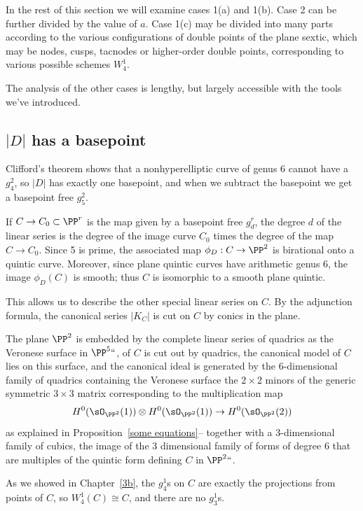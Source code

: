 In the rest of this section we will examine cases 1(a) and 1(b). Case 2 can
be further divided by the value of $a$.
Case 1(c) may be divided into many parts according to the various
configurations
of double points of the plane sextic, which may be nodes, cusps, tacnodes
or higher-order double points,  corresponding to various possible
schemes $W^{1}_{4}$.

The analysis of the other cases is lengthy, but largely accessible with
the tools we've introduced.


\subsection*{$|D|$ has a basepoint}

Clifford's theorem shows that a nonhyperelliptic curve of genus 6 cannot
have a $g^2_4$, so
$|D|$ has exactly one basepoint, and when we subtract the basepoint we
get a basepoint free $g^2_5$.
%

If $C \to C_0 \subset \PP^r$ is the map given by a basepoint free $g^r_d$,
the degree $d$ of the linear series is the degree of the image curve $C_0$
times the degree of the map $C \to C_0$. Since 5 is prime, the associated
map $\phi_D : C \to \PP^2$ is birational onto a quintic curve. Moreover,
since
%
plane quintic
 curves have
arithmetic genus 6,
%
the image $\phi_D(C)$
is smooth; thus $C$ is isomorphic to a smooth plane quintic.

This allows us to describe the other special linear series on $C$. By
the adjunction formula, the canonical series $|K_C|$ is cut on $C$
by conics in the plane.

The plane $\PP^2$ is embedded by the complete linear series of quadrics
as the
Veronese surface in $\PP^5``$,
%
of $C$ is cut out by quadrics, the canonical model of $C$
lies on this surface, and the canonical ideal is generated by the
6-dimensional family of quadrics containing the Veronese surface\emdash
the $2\times 2$ minors of the generic symmetric $3\times 3$ matrix
corresponding to the multiplication map
$$
H^{0}(\sO_{\PP^{2}}(1)) \otimes H^{0}(\sO_{\PP^{2}}(1)) \to
H^{0}(\sO_{\PP^{2}}(2))
$$
as explained in Proposition~\ref{some equations}-- together with a
3-dimensional family of cubics,  the image of the 3 dimensional family
of forms of degree 6 that are multiples of the quintic form defining $C$
in $\PP^2` `$.

As we showed in Chapter~\ref{3b}, the $g^1_4$s on $C$ are exactly the
projections from points of $C$, so $W^1_4(C)\cong C$, and there are no
$g^{1}_{3}$s.


